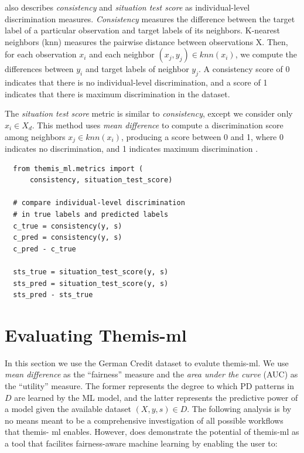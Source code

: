 \documentclass{interact}
\begin{document}
\cite{zliobaite2015survey} also describes \emph{consistency} and \emph{situation
test score} as individual-level discrimination measures. \emph{Consistency}
measures the difference between the target label of a particular observation and
target labels of its neighbors. K-nearest neighbors (knn) measures the pairwise
distance between observations X. Then, for each observation \(x_i\) and each
neighbor \((x_j, y_j) \in knn(x_i)\), we compute the differences between \(y_i\)
and target labels of neighbor \(y_j\). A consistency score of 0 indicates that
there is no individual-level discrimination, and a score of 1 indicates that
there is maximum discrimination in the dataset.

The \emph{situation test score} metric is similar to \emph{consistency}, except
we consider only \(x_i \in X_d\). This method uses \emph{mean difference} to
compute a discrimination score among neighbors \(x_j \in knn(x_i)\), producing a
score between 0 and 1, where 0 indicates no discrimination, and 1 indicates
maximum discrimination \cite{zliobaite2015survey}.

\begin{verbatim}
  from themis_ml.metrics import (
      consistency, situation_test_score)

  # compare individual-level discrimination
  # in true labels and predicted labels
  c_true = consistency(y, s)
  c_pred = consistency(y, s)
  c_pred - c_true

  sts_true = situation_test_score(y, s)
  sts_pred = situation_test_score(y, s)
  sts_pred - sts_true
\end{verbatim}

\section{Evaluating Themis-ml}

In this section we use the German Credit dataset \cite{bache2013uci} to evalute
themis-ml. We use \emph{mean difference} as the ``fairness'' measure and the
\emph{area under the curve} (AUC) as the ``utility'' measure. The former
represents the degree to which PD patterns in \(D\) are learned by the ML model,
and the latter represents the predictive power of a model given the available
dataset \((X, y, s) \in D\). The following analysis is by no means meant to be a
comprehensive investigation of all possible workflows that themis- ml enables.
However, does demonstrate the potential of themis-ml as a tool that facilites
fairness-aware machine learning by enabling the user to:
\end{document}
